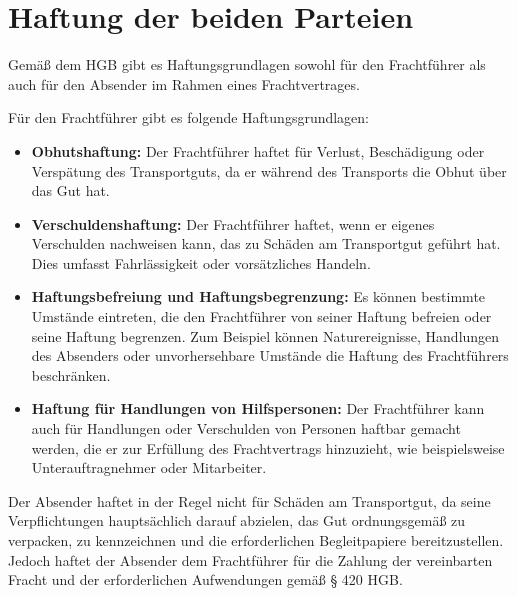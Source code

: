 \section{Haftung der beiden Parteien}
Gemäß dem HGB gibt es Haftungsgrundlagen sowohl für den Frachtführer als auch für den Absender im Rahmen eines Frachtvertrages.

Für den Frachtführer gibt es folgende Haftungsgrundlagen:
\begin{itemize}
    \item \textbf{Obhutshaftung:} Der Frachtführer haftet für Verlust, Beschädigung oder Verspätung des Transportguts, da er während des Transports die Obhut über das Gut hat.
    \item \textbf{Verschuldenshaftung:} Der Frachtführer haftet, wenn er eigenes Verschulden nachweisen kann, das zu Schäden am Transportgut geführt hat. Dies umfasst Fahrlässigkeit oder vorsätzliches Handeln.
    \item \textbf{Haftungsbefreiung und Haftungsbegrenzung:} Es können bestimmte Umstände eintreten, die den Frachtführer von seiner Haftung befreien oder seine Haftung begrenzen. Zum Beispiel können Naturereignisse, Handlungen des Absenders oder unvorhersehbare Umstände die Haftung des Frachtführers beschränken.
    \item \textbf{Haftung für Handlungen von Hilfspersonen:} Der Frachtführer kann auch für Handlungen oder Verschulden von Personen haftbar gemacht werden, die er zur Erfüllung des Frachtvertrags hinzuzieht, wie beispielsweise Unterauftragnehmer oder Mitarbeiter.
\end{itemize}

Der Absender haftet in der Regel nicht für Schäden am Transportgut, da seine Verpflichtungen hauptsächlich darauf abzielen, das Gut ordnungsgemäß zu verpacken, zu kennzeichnen und die erforderlichen Begleitpapiere bereitzustellen. Jedoch haftet der Absender dem Frachtführer für die Zahlung der vereinbarten Fracht und der erforderlichen Aufwendungen gemäß § 420 \ac{HGB}.